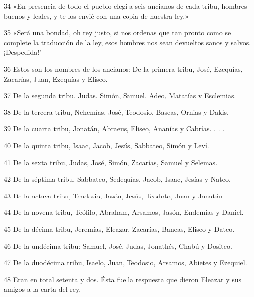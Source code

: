 \par 34 «En presencia de todo el pueblo elegí a seis ancianos de cada tribu, hombres buenos y leales, y te los envié con una copia de nuestra ley.»

\par 35 «Será una bondad, oh rey justo, si nos ordenas que tan pronto como se complete la traducción de la ley, esos hombres nos sean devueltos sanos y salvos. ¡Despedida!'

\par 36 Estos son los nombres de los ancianos: De la primera tribu, José, Ezequías, Zacarías, Juan, Ezequías y Eliseo.

\par 37 De la segunda tribu, Judas, Simón, Samuel, Adeo, Matatías y Esclemias.

\par 38 De la tercera tribu, Nehemías, José, Teodosio, Baseas, Ornias y Dakis.

\par 39 De la cuarta tribu, Jonatán, Abraeus, Eliseo, Ananías y Cabrías. . . .

\par 40 De la quinta tribu, Isaac, Jacob, Jesús, Sabbateo, Simón y Leví.

\par 41 De la sexta tribu, Judas, José, Simón, Zacarías, Samuel y Selemas.

\par 42 De la séptima tribu, Sabbateo, Sedequías, Jacob, Isaac, Jesías y Nateo.

\par 43 De la octava tribu, Teodosio, Jasón, Jesús, Teodoto, Juan y Jonatán.

\par 44 De la novena tribu, Teófilo, Abraham, Arsamos, Jasón, Endemias y Daniel.

\par 45 De la décima tribu, Jeremías, Eleazar, Zacarías, Baneas, Eliseo y Dateo.

\par 46 De la undécima tribu: Samuel, José, Judas, Jonathés, Chabú y Dositeo.

\par 47 De la duodécima tribu, Isaelo, Juan, Teodosio, Arsamos, Abietes y Ezequiel.

\par 48 Eran en total setenta y dos. Ésta fue la respuesta que dieron Eleazar y sus amigos a la carta del rey.

